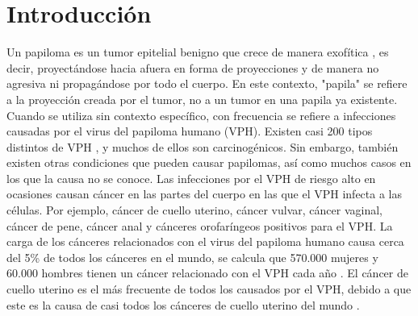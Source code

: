 \section{Introducción}
Un papiloma es un tumor epitelial benigno que crece de manera exofítica \cite{Kozomara2007}, es decir, proyectándose hacia afuera en forma de proyecciones y de manera no agresiva ni propagándose por todo el cuerpo. En este contexto, "papila" se refiere a la proyección creada por el tumor, no a un tumor en una papila ya existente.
Cuando se utiliza sin contexto específico, con frecuencia se refiere a infecciones causadas por el virus del papiloma humano (VPH). Existen casi 200 tipos distintos de VPH \cite{Ljubojevic2014}, y muchos de ellos son carcinogénicos. Sin embargo, también existen otras condiciones que pueden causar papilomas, así como muchos casos en los que la causa no se conoce.
Las infecciones por el VPH de riesgo alto en ocasiones causan cáncer en las partes del cuerpo en las que el VPH infecta a las células. Por ejemplo, cáncer de cuello uterino, cáncer vulvar, cáncer vaginal, cáncer de pene, cáncer anal y cánceres orofaríngeos positivos para el VPH. La carga de los cánceres relacionados con el virus del papiloma humano causa cerca del 5\% \cite{papiloma} de todos los cánceres en el mundo, se calcula que 570.000 mujeres y 60.000 hombres tienen un cáncer relacionado con el VPH cada año \cite{papiloma} . El cáncer de cuello uterino es el más frecuente de todos los causados por el VPH, debido a que este es la causa de casi todos los cánceres de cuello uterino del mundo \cite{papiloma}.
